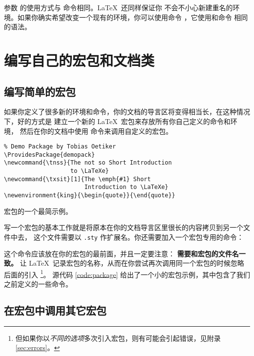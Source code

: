 参数  的使用方式与  命令相同。\LaTeX\ 还同样保证你
不会不小心新建重名的环境。如果你确实希望改变一个现有的环境，你可以使用命令
 ，它使用和命令  相同的语法。

\section{编写自己的宏包和文档类}

\subsection{编写简单的宏包}

如果你定义了很多新的环境和命令，你的文档的导言区将变得相当长，在这种情况下，好的方式是
建立一个新的 \LaTeX\ 宏包来存放所有你自己定义的命令和环境，
然后在你的文档中使用  命令来调用自定义的宏包。

\begin{sourcecode}[htbp]
\begin{Verbatim}
% Demo Package by Tobias Oetiker
\ProvidesPackage{demopack}
\newcommand{\tnss}{The not so Short Introduction
                   to \LaTeXe}
\newcommand{\txsit}[1]{The \emph{#1} Short
                       Introduction to \LaTeXe}
\newenvironment{king}{\begin{quote}}{\end{quote}}
\end{Verbatim}
\caption{宏包的一个最简示例。}\label{code:package}
\end{sourcecode}

写一个宏包的基本工作就是将原本在你的文档导言区里很长的内容拷贝到另一个文件中去，
 这个文件需要以 \texttt{.sty} 作扩展名。你还需要加入一个宏包专用的命令：
\begin{command}
\end{command}
这个命令应该放在你的宏包的最前面，并且一定要注意：\textbf{ 需要和宏包的文件名一致。}
 让 \LaTeX\ 记录宏包的名称，从而在你尝试再次调用同一个宏包的时候忽略后面的引入%
\footnote{但如果你以\emph{不同的选项}多次引入宏包，则有可能会引起错误，见附录 \ref{sec:errors}。}。
源代码 \ref{code:package} 给出了一个小的宏包示例，其中包含了我们之前定义的一些命令。

\subsection{在宏包中调用其它宏包}

